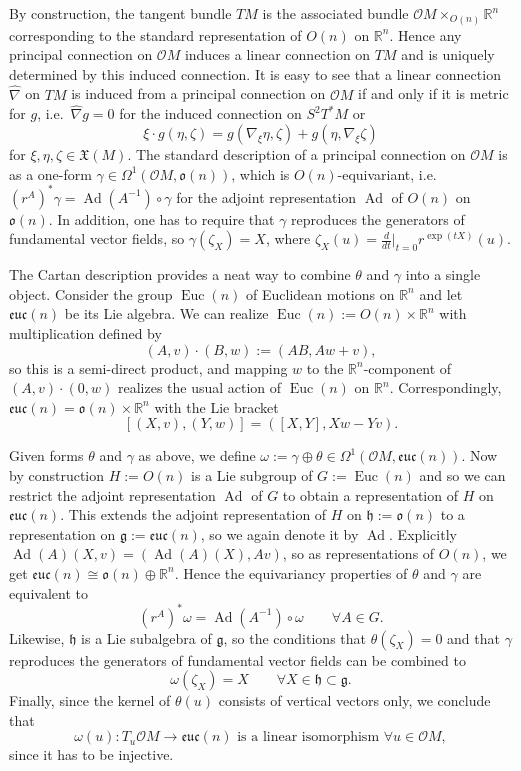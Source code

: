 \documentclass[12pt,a4paper]{amsart}
\def\frak{\mathfrak}
\def\Bbb{\mathbb}
\def\Cal{\mathcal}
\newcommand{\x}{\times}
\renewcommand{\o}{\circ}
\newcommand{\om}{\omega}
\renewcommand{\th}{\theta}
\newcommand{\ze}{\zeta}
\newcommand{\Om}{\Omega}
\newcommand{\Ad}{\operatorname{Ad}}
\newcommand{\Euc}{\operatorname{Euc}}
\newcommand{\euc}{\mathfrak{euc}}
\numberwithin{theorem}{section}
\numberwithin{equation}{section}
\theoremstyle{definition}
\theoremstyle{remark}
\begin{document}
By construction, the tangent bundle $TM$ is the associated bundle $\Cal
OM\x_{O(n)}\Bbb R^n$ corresponding to the standard representation of $O(n)$ on $\Bbb
R^n$. Hence any principal connection on $\Cal OM$ induces a linear connection on $TM$
and is uniquely determined by this induced connection. It is easy to see that a
linear connection $\hat\nabla$ on $TM$ is induced from a principal connection on
$\Cal OM$ if and only if it is metric for $g$, i.e.\ $\hat\nabla g=0$ for the induced
connection on $S^2T^*M$ or
$$
\xi\cdot g(\eta,\zeta)=g(\nabla_\xi\eta,\zeta)+g(\eta,\nabla_\xi\zeta)
$$
for $\xi,\eta,\zeta\in\frak X(M)$. The standard description of a principal
connection on $\Cal OM$ is as a one-form $\gamma\in\Om^1(\Cal OM,\frak o(n))$, which
is $O(n)$-equivariant, i.e.~$(r^A)^*\gamma=\Ad(A^{-1})\o\gamma$ for the adjoint
representation $\Ad$ of $O(n)$ on $\frak o(n)$. In addition, one has to require that
$\gamma$ reproduces the generators of fundamental vector fields, so
$\gamma(\ze_X)=X$, where $\ze_X(u)=\tfrac{d}{dt}|_{t=0}r^{\exp(tX)}(u)$.

The Cartan description provides a neat way to combine $\th$ and $\gamma$ into a
single object. Consider the group $\Euc(n)$ of Euclidean motions on $\Bbb R^n$ and
let $\euc(n)$ be its Lie algebra. We can realize $\Euc(n):=O(n)\x\Bbb R^n$ with
multiplication defined by
$$
(A,v)\cdot (B,w):=(AB,Aw+v),
$$
so this is a semi-direct product, and mapping $w$ to the $\Bbb R^n$-component of
$(A,v)\cdot (0,w)$ realizes the usual action of $\Euc(n)$ on $\Bbb
R^n$. Correspondingly, $\euc(n)=\frak o(n)\x\Bbb R^n$ with the Lie bracket
\begin{equation}\label{euc-bracket}
[(X,v),(Y,w)]=([X,Y],Xw-Yv). 
\end{equation}

Given forms $\th$ and $\gamma$ as above, we define 
$\om:=\gamma\oplus\th\in\Om^1(\Cal OM,\euc(n))$. Now by construction $H:=O(n)$ is a
Lie subgroup of $G:=\Euc(n)$ and so we can restrict the adjoint representation $\Ad$
of $G$ to obtain a representation of $H$ on $\euc(n)$. This extends the adjoint
representation of $H$ on $\frak h:=\frak o(n)$ to a representation on $\frak
g:=\euc(n)$, so we again denote it by $\Ad$. Explicitly $\Ad(A)(X,v)=(\Ad(A)(X),Av)$,
so as representations of $O(n)$, we get $\euc(n)\cong \frak o(n)\oplus\Bbb
R^n$. Hence the equivariancy properties of $\th$ and $\gamma$ are equivalent to
\begin{equation}\label{om-equiv}
  (r^A)^*\om=\Ad(A^{-1})\o\om \qquad \forall A\in G. 
\end{equation}
Likewise, $\frak h$ is a Lie subalgebra of $\frak g$, so the conditions that
$\th(\ze_X)=0$ and that $\gamma$ reproduces the generators of fundamental vector fields
can be combined to
\begin{equation}\label{om-fund}
  \om(\ze_X)=X\qquad \forall X\in\frak h\subset\frak g.
\end{equation}
Finally, since
the kernel of $\th(u)$ consists of vertical vectors only, we conclude that
\begin{equation}\label{om-iso}
  \om(u):T_u\Cal OM\to\euc(n)\text{\ is a linear isomorphism\ }\forall u\in\Cal OM,
\end{equation}
since it has to be injective.
\end{document}
